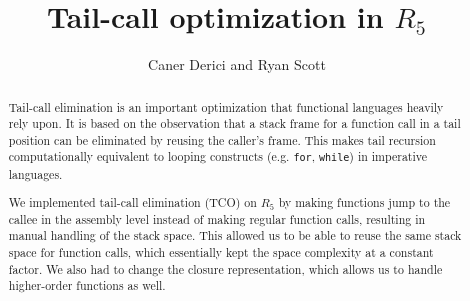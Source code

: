 \documentclass[12pt]{article}
\begin{document}
%
%
%
%
%
%
%
%

\title{Tail-call optimization in $R_5$\vspace{-2ex}}
\author{Caner Derici and Ryan Scott} 
 
\maketitle

\begin{abstract}
  Tail-call elimination is an important optimization that
  functional languages heavily rely upon. It is based on the
  observation that a stack frame for a function call in a
  tail position can be eliminated by reusing the caller's frame. This
  makes tail recursion computationally equivalent to
  looping constructs (e.g. \verb+for+, \verb+while+) in imperative languages.

  We implemented tail-call elimination (TCO) on $R_5$ by making
  functions jump to the callee in the assembly level instead of making
  regular function calls, resulting in manual handling of the stack
  space. This allowed us to be able to reuse the same stack space for
  function calls, which essentially kept the space complexity at a
  constant factor. We also had to change the closure representation,
  which allows us to handle higher-order functions as well.
\end{abstract}
\end{document}

